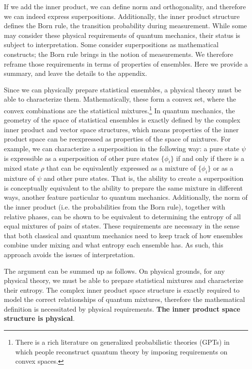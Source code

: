 \documentclass[10pt,twocolumn, nofootinbib]{revtex4-2}
\begin{document}
If we add the inner product, we can define norm and orthogonality, and therefore we can indeed express superpositions. Additionally, the inner product structure defines the Born rule, the transition probability during measurement. While some may consider these physical requirements of quantum mechanics, their status is subject to interpretation.\cite{albert_quantum_1994, wallace_everett_2013, howard_complementarity_2021, ghirardi_unified_1986} Some consider superpositions as mathematical constructs; the Born rule brings in the notion of measurements. We therefore reframe those requirements in terms of properties of ensembles. Here we provide a summary, and leave the details to the appendix.

Since we can physically prepare statistical ensembles, a physical theory must be able to characterize them. Mathematically, these form a convex set, where the convex combinations are the statistical mixtures.\footnote{There is a rich literature on generalized probabilistic theories (GPTs) in which people reconstruct quantum theory by imposing requirements on convex spaces.\cite{gpt_overview_2021}} In quantum mechanics, the geometry of the space of statistical ensembles is exactly defined by the complex inner product and vector space structures, which means properties of the inner product space can be reexpressed as properties of the space of mixtures. For example, we can characterize a superposition in the following way: a pure state $\psi$ is expressible as a superposition of other pure states $\{\phi_i\}$ if and only if there is a mixed state $\rho$ that can be equivalently expressed as a mixture of $\{\phi_i\}$ or as a mixture of $\psi$ and other pure states. That is, the ability to create a superposition is conceptually equivalent to the ability to prepare the same mixture in different ways, another feature particular to quantum mechanics. Additionally, the norm of the inner product (i.e. the probabilities from the Born rule), together with relative phases, can be shown to be equivalent to determining the entropy of all equal mixtures of pairs of states. These requirements are necessary in the sense that both classical and quantum mechanics need to keep track of how ensembles combine under mixing and what entropy each ensemble has. As such, this approach avoids the issues of interpretation.

The argument can be summed up as follows. On physical grounds, for any physical theory, we must be able to prepare statistical mixtures and characterize their entropy. The complex inner product space structure is exactly required to model the correct relationships of quantum mixtures, therefore the mathematical definition is necessitated by physical requirements. \textbf{The inner product space structure is physical}.
\end{document}
